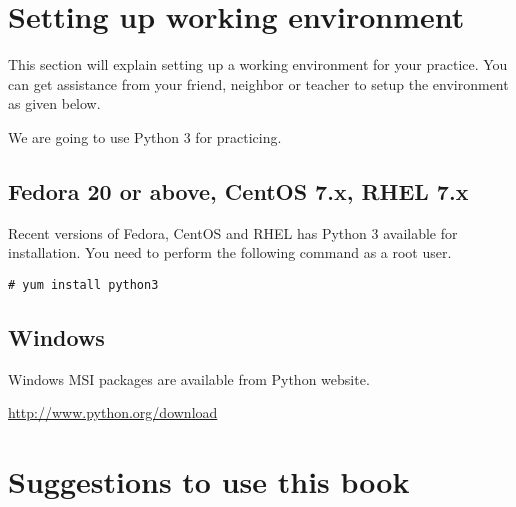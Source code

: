 \section{Setting up working environment}

This section will explain setting up a working environment for your
practice.  You can get assistance from your friend, neighbor or
teacher to setup the environment as given below.

We are going to use Python 3 for practicing.

\begin{center}\begin{sffamily}

\end{sffamily}
\end{center}

\subsection{Fedora 20 or above, CentOS 7.x, RHEL 7.x}

Recent versions of Fedora, CentOS and RHEL has Python 3 available for
installation.  You need to perform the following command as a root user.

\begin{verbatim}
# yum install python3
\end{verbatim}

\subsection{Windows}

Windows MSI packages are available from Python website.

\url{http://www.python.org/download}

\section{Suggestions to use this book}
